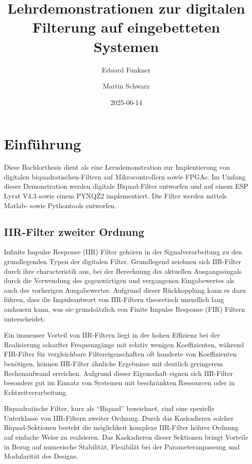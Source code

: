 \documentclass[
  ngerman,
  letterpaper,
  DIV=11]{scrreprt}
\title{Lehrdemonstrationen zur digitalen Filterung auf eingebetteten
Systemen}
\author{Eduard Funkner \and Martin Schwarz}
\date{2025-06-14}
\renewcommand*\contentsname{Inhaltsverzeichnis}
\newcommand\contentsname{Inhaltsverzeichnis}
\begin{document}
\maketitle

\renewcommand*\contentsname{Inhaltsverzeichnis}
{
\hypersetup{linkcolor=}
\setcounter{tocdepth}{2}
\tableofcontents
}

\chapter{Einführung}\label{einfuxfchrung}

Diese Bachlorthesis dient als eine Lerndemonstration zur Implentierung
von digitalen biquadratischen-Filtern auf Mikrocontrollern sowie FPGAs.
Im Umfang dieser Demonstration werden digitale Biquad-Filter entworfen
und auf einem ESP Lyrat V4.3 sowie einem PYNQZ2 implementiert. Die
Filter werden mittels Matlab- sowie Pythontools entworfen.

\section{IIR-Filter zweiter Ordnung}\label{iir-filter-zweiter-ordnung}

Infinite Impulse Response (IIR) Filter gehören in der Signalverarbeitung
zu den grundlegenden Typen der digitalen Filter. Grundlegend zeichnen
sich IIR-Filter durch ihre characteristik aus, bei der Berechnung des
aktuellen Ausgangssingals durch die Verwendung des gegenwärtigen und
vergangenen Eingabewertes als auch des vorherigen Ausgabewertes.
Aufgrund dieser Rückkopplung kann es dazu führen, dass die Impulsantwort
von IIR-Filtern theoretisch unendlich lang andauern kann, was sie
grundsätzlich von Finite Impulse Response (FIR) Filtern unterscheidet.

Ein immenser Vorteil von IIR-Filtern liegt in der hohen Effizienz bei
der Realisierung scharfter Frequenzgänge mit relativ wenigen
Koeffizienten, während FIR-Filter für vergleichbare Filtereigenschaften
oft hunderte von Koeffizienten benötigen, können IIR-Filter ähnliche
Ergebnisse mit deutlich geringerem Rechenaufwand erreichen. Aufgrund
dieser Eigenschaft eignen sich IIR-Filter besonders gut im Einsatz von
Systemen mit beschränkten Ressourcen oder in Echtzeitverarbeitung.

Biquadratische Filter, kurz als ``Biquad'' bezeichnet, sind eine
spezielle Unterklasse von IIR-Filtern zweiter Ordnung. Durch das
Kaskadieren solcher Biquad-Sektionen besteht die möglichkeit komplexe
IIR-Filter höhrer Ordnung auf einfache Weise zu realsieren. Das
Kaskadieren dieser Sektionen bringt Vorteile in Bezug auf numerische
Stabilität, Flexibilät bei der Parameteranpassung und Modularität des
Designs.
\end{document}
